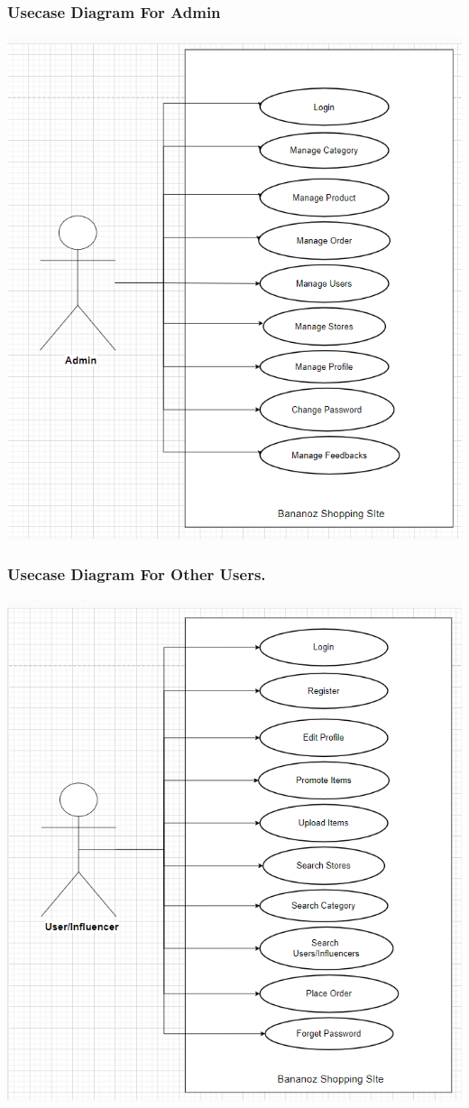 \subsubsection{Usecase Diagram For Admin}
\includegraphics[scale=0.7]{Diag/admin-use-case.png}

\label{fig:Use case diagram For Admin}
\subsubsection{Usecase Diagram For Other Users.}
\includegraphics[scale=0.8]{Diag/user-use-case.png}

